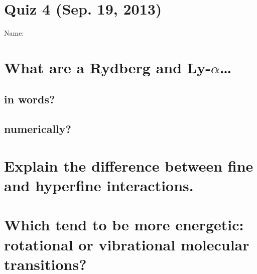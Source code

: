 \documentclass[11pt]{article}
\begin{document}
\pagestyle{empty}
\parindent=0pt

\section*{\centering Quiz 4 (Sep. 19, 2013)}

{\large
Name:\\
}

\section{What are a Rydberg and Ly-$\alpha$\dots}
\subsection{in words?}
\vspace{1.5in}
\subsection{numerically?}
\vspace{1.5in}

\section{Explain the difference between fine and hyperfine interactions.}
\vspace{1.5in}

\section{Which tend to be more energetic: rotational or vibrational molecular transitions?}
~
\vspace{1.5in}
\end{document}
